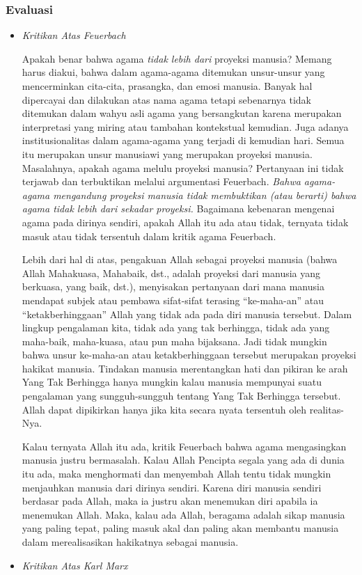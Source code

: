 \documentclass[10pt,a4paper]{article}
\begin{document}
\begin{multicols}{2}
\hypertarget{evaluasi}{%
\subsubsection{Evaluasi}\label{evaluasi}}

\begin{itemize}
\item
  \emph{Kritikan Atas Feuerbach}

  Apakah benar bahwa agama \emph{tidak lebih dari} proyeksi manusia?
  Memang harus diakui, bahwa dalam agama-agama ditemukan unsur-unsur
  yang mencerminkan cita-cita, prasangka, dan emosi manusia. Banyak hal
  dipercayai dan dilakukan atas nama agama tetapi sebenarnya tidak
  ditemukan dalam wahyu asli agama yang bersangkutan karena merupakan
  interpretasi yang miring atau tambahan kontekstual kemudian. Juga
  adanya institusionalitas dalam agama-agama yang terjadi di kemudian
  hari. Semua itu merupakan unsur manusiawi yang merupakan proyeksi
  manusia. Masalahnya, apakah agama melulu proyeksi manusia? Pertanyaan
  ini tidak terjawab dan terbuktikan melalui argumentasi Feuerbach.
  \emph{Bahwa agama-agama mengandung proyeksi manusia tidak membuktikan
  (atau berarti) bahwa agama tidak lebih dari sekadar proyeksi.}
  Bagaimana kebenaran mengenai agama pada dirinya sendiri, apakah Allah
  itu ada atau tidak, ternyata tidak masuk atau tidak tersentuh dalam
  kritik agama Feuerbach.

  Lebih dari hal di atas, pengakuan Allah sebagai proyeksi manusia
  (bahwa Allah Mahakuasa, Mahabaik, dst., adalah proyeksi dari manusia
  yang berkuasa, yang baik, dst.), menyisakan pertanyaan dari mana
  manusia mendapat subjek atau pembawa sifat-sifat terasing
  ``ke-maha-an'' atau ``ketakberhinggaan'' Allah yang tidak ada pada
  diri manusia tersebut. Dalam lingkup pengalaman kita, tidak ada yang
  tak berhingga, tidak ada yang maha-baik, maha-kuasa, atau pun maha
  bijaksana. Jadi tidak mungkin bahwa unsur ke-maha-an atau
  ketakberhinggaan tersebut merupakan proyeksi hakikat manusia. Tindakan
  manusia merentangkan hati dan pikiran ke arah Yang Tak Berhingga hanya
  mungkin kalau manusia mempunyai suatu pengalaman yang sungguh-sungguh
  tentang Yang Tak Berhingga tersebut. Allah dapat dipikirkan hanya jika
  kita secara nyata tersentuh oleh realitas-Nya.

  Kalau ternyata Allah itu ada, kritik Feuerbach bahwa agama
  mengasingkan manusia justru bermasalah. Kalau Allah Pencipta segala
  yang ada di dunia itu ada, maka menghormati dan menyembah Allah tentu
  tidak mungkin menjauhkan manusia dari dirinya sendiri. Karena diri
  manusia sendiri berdasar pada Allah, maka ia justru akan menemukan
  diri apabila ia menemukan Allah. Maka, kalau ada Allah, beragama
  adalah sikap manusia yang paling tepat, paling masuk akal dan paling
  akan membantu manusia dalam merealisasikan hakikatnya sebagai manusia.
\item
  \emph{Kritikan Atas Karl Marx}


\end{itemize}
\end{multicols}
\end{document}
